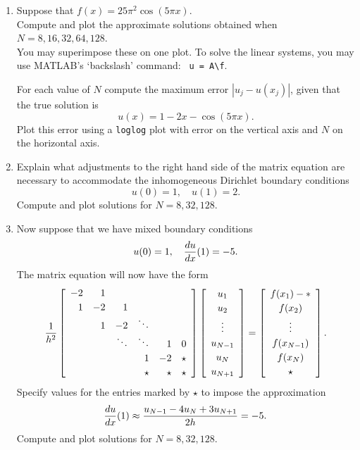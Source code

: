 \begin{enumerate}
\item Suppose that $f(x) = 25 \pi^2 \cos (5\pi x)$.\\
      Compute and plot the approximate solutions obtained when $N=8, 16, 32, 64, 128$.\\
      You may superimpose these on one plot.  
       To solve the linear systems, you may use MATLAB's `backslash' command: 
        \verb| u = A\f|.
      
      For each value of $N$ compute the maximum error $|u_j - u(x_j)|$, given that
      the true solution is  \[u(x) = 1-2x-\cos(5\pi x).\]
      Plot this error using a \verb|loglog| plot 
      with error on the vertical axis and $N$ on the horizontal axis.
     
\vspace*{1.5em} 
\item Explain what adjustments to the right hand side of the matrix equation 
      are necessary to accommodate the inhomogeneous Dirichlet boundary conditions 
      \[ u(0)=1,\quad  u(1)=2.\]
      Compute and plot solutions for $N=8, 32, 128$. 

\vspace*{1.5em} 
\item Now suppose that we have mixed boundary conditions
           \[ u(0) = 1, \quad {d u\over dx}(1) = -5.\]
      The matrix equation will now have the form
\[ {1\over h^2} \left[\begin{array}{rrrrrr}
              -2 & 1 \\[0.25em]
               1 & -2 & 1 \\
                 &  1  & -2 & \ddots \\
                 & & \ddots & \ddots & 1 & 0 \\[0.25em]
                 & & & 1 & -2 & \star \\[0.25em]
                 & & & \star &  \star & \star \end{array}\right]
          \left[\begin{array}{c} u_1 \\[0.25em] u_2 \\[0.25em] \vdots \\[0.25em] u_{N-1} \\[0.25em] u_N \\[0.25em] u_{N+1}\end{array}\right]
 =   \left[\begin{array}{c} f(x_1) - *\\[0.25em] f(x_2) \\[0.25em] \vdots \\[0.25em] f(x_{N-1}) \\[0.25em] f(x_N)\\[0.25em] \star \end{array}\right].\]
      Specify values for the entries marked by $\star$ to impose the approximation
            \[ {{{du \over dx}(1)} \approx {u_{N-1} - 4u_N + 3u_{N+1} \over 2h} = -5}.\]
      Compute and plot solutions for $N=8, 32, 128$. 


\end{enumerate}
